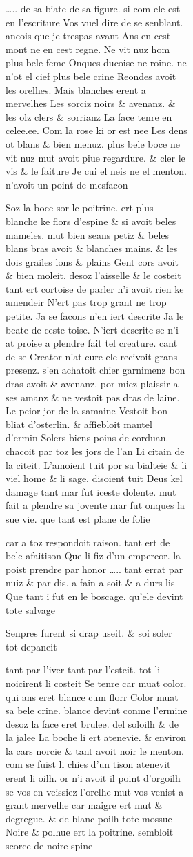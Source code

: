 \documentclass[
  letterpaper,
  DIV=11,
  numbers=noendperiod,
  oneside]{scrreprt}
\begin{document}
\begin{figure}
\begin{figure}
\begin{figure}
\begin{minipage}{0.20\linewidth}
\ldots.. de sa biate de sa figure. si com ele est en l'escriture Vos
vuel dire de se senblant. ancois que je trespas avant Ans en cest mont
ne en cest regne. Ne vit nuz hom plus bele feme Onques ducoise ne roine.
ne n'ot el cief plus bele crine Reondes avoit les orelhes. Mais
{blanches} erent a mervelhes Les sorciz {noirs} \& avenanz. \& les olz
{clers} \& sorrianz {La face tenre en {celee.ee.}} {{Com la rose ki or
est nee}} {Les dens ot {blans} \& bien menuz.} {plus bele boce ne vit
nuz} {mut avoit piue regardure.} {\& {cler} le vis \& le faiture} {Je
cui el neis ne el menton.} {n'avoit un point de mesfacon}

{Soz la boce sor le poitrine.} {ert {plus blanche ke flors d'espine}}
{\& si avoit beles mameles.} {mut bien seans petiz \& beles} {{blans
bras} avoit \& {blanches mains}.} {\& les dois grailes lons \& plains}
{Gent cors avoit \& bien moleit.} {desoz l'aisselle \& le costeit} {tant
ert cortoise de parler} {n'i avoit rien ke amendeir} {N'ert pas trop
grant ne trop petite.} {Ja se facons n'en iert descrite} {Ja le beate de
ceste {toise}.} {N'iert descrite se n'i at {proise}} a plendre fait tel
creature. cant de se Creator n'at cure ele recivoit grans presenz. s'en
achatoit chier garnimenz bon dras avoit \& avenanz. por miez plaissir a
ses amanz \& ne {vestoit} pas dras de laine. Le peior jor de la samaine
Vestoit bon bliat {d'osterlin}. \& affiebloit mantel d'ermin Solers
{biens poins} de corduan. chacoit par toz les jors de l'an Li citain de
la citeit. L'amoient tuit por sa bialteie \& li viel home \& li sage.
disoient tuit Deus kel damage tant mar fut iceste dolente. mut fait a
plendre sa jovente mar fut onques la sue vie. que tant est plane de
folie

car a toz respondoit raison. tant ert de bele afaitison Que li fiz d'un
empereor. la poist prendre par honor \ldots.. tant errat {par nuiz \&
par dis.} a fain a soit \& a durs lis Que tant i fut en le boscage.
qu'ele devint tote salvage

Senpres furent si drap useit. \& soi soler tot depaneit

{tant par l'iver tant par l'esteit.} {tot li {noicirent} li costeit} {Se
tenre car {muat color}.} {qui ans eret {blance cum florr}} {Color muat
sa bele crine.} {blance devint conme l'ermine} desoz la face eret
{brulee}. del soloilh \& de la jalee La boche li ert atenevie. \&
environ la cars {norcie} \& tant avoit {noir} le menton. {com se fuist
li chies d'un tison} {atenevit} erent li oilh. or n'i avoit il point
d'orgoilh se vos en veissiez l'orelhe mut vos venist a grant mervelhe
car maigre ert mut \& degregue. \& de {blanc} poilh tote mossue {Noire}
\& polhue ert la poitrine. sembloit scorce de {noire} spine


\end{minipage}
\end{figure}
\end{figure}
\end{figure}
\end{document}
